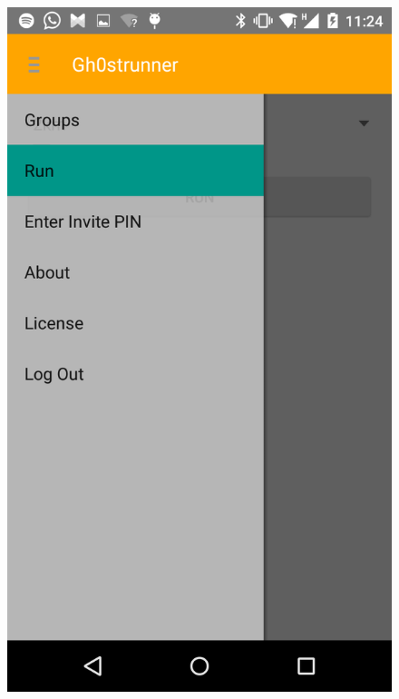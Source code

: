 \begin{figure}
\centering
\begin{minipage}{.4\textwidth}
  \centering
  \includegraphics[width=.8\linewidth]{abb/bsp/bsp7}
  \label{fig:bsp7}
\end{minipage}
\begin{minipage}{.4\textwidth}
  \centering

\end{minipage}
\end{figure}
